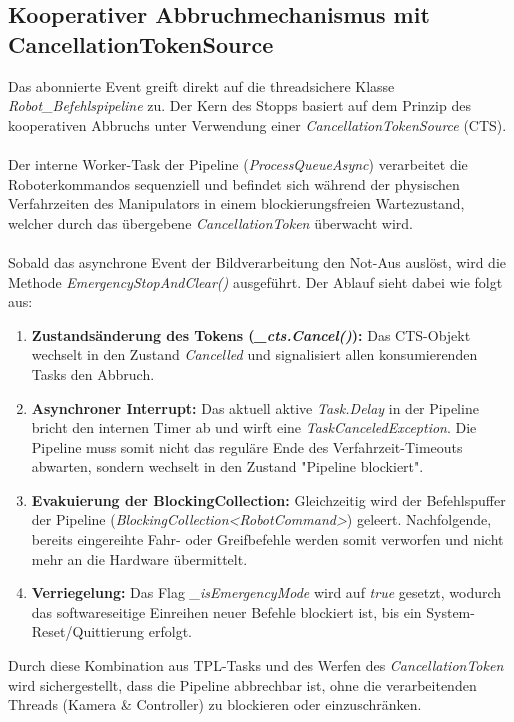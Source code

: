 \subsection{Kooperativer Abbruchmechanismus mit CancellationTokenSource}
Das abonnierte Event greift direkt auf die threadsichere Klasse \textit{Robot\_Befehlspipeline} zu. Der Kern des Stopps basiert auf dem Prinzip des kooperativen Abbruchs unter Verwendung einer \textit{CancellationTokenSource} (CTS). \\
\\Der interne Worker-Task der Pipeline (\textit{ProcessQueueAsync}) verarbeitet die Roboterkommandos sequenziell und befindet sich während der physischen Verfahrzeiten des Manipulators in einem blockierungsfreien Wartezustand, welcher durch das übergebene \textit{CancellationToken} überwacht wird.\\
\\Sobald das asynchrone Event der Bildverarbeitung den Not-Aus auslöst, wird die Methode \textit{EmergencyStopAndClear()} ausgeführt.
Der Ablauf sieht dabei wie folgt aus:
\begin{enumerate}
	\item \textbf{Zustandsänderung des Tokens (\textit{\_cts.Cancel()}):} Das CTS-Objekt wechselt in den Zustand \textit{Cancelled} und signalisiert allen konsumierenden Tasks den Abbruch. 
	\item \textbf{Asynchroner Interrupt:} Das aktuell aktive \textit{Task.Delay} in der Pipeline bricht den internen Timer ab und wirft eine \textit{TaskCanceledException}. Die Pipeline muss somit nicht das reguläre Ende des Verfahrzeit-Timeouts abwarten, sondern wechselt in den Zustand "Pipeline blockiert".
	\item \textbf{Evakuierung der BlockingCollection:} Gleichzeitig wird der Befehlspuffer der Pipeline (\textit{BlockingCollection<RobotCommand>}) geleert. Nachfolgende, bereits eingereihte Fahr- oder Greifbefehle werden somit verworfen und nicht mehr an die Hardware übermittelt.
	\item \textbf{Verriegelung:} Das Flag \textit{\_isEmergencyMode} wird auf \textit{true} gesetzt, wodurch das softwareseitige Einreihen neuer Befehle blockiert ist, bis ein System-Reset/Quittierung erfolgt.
\end{enumerate}
Durch diese Kombination aus TPL-Tasks und des Werfen des \textit{CancellationToken} wird sichergestellt, dass die Pipeline abbrechbar ist, ohne die verarbeitenden Threads (Kamera \& Controller) zu blockieren oder einzuschränken.